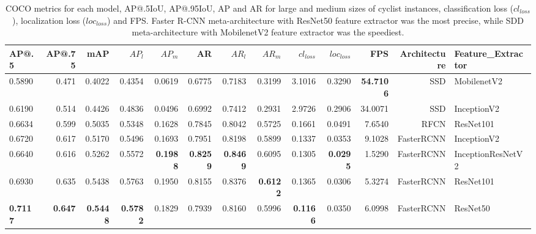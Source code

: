 \documentclass[journal]{IEEEtran}
\begin{document}
\begin{table*}[hb!]
\begin{minipage}[c]{0.95\textwidth}
\caption{COCO metrics for each model, AP@.5IoU, AP@.95IoU, AP and AR for large and medium sizes of cyclist instances, classification loss ($cl_{loss}$), localization loss ($loc_{loss}$) and FPS. Faster R-CNN meta-architecture with ResNet50 feature extractor was the most precise, while SDD meta-architecture with MobilenetV2 feature extractor was the speediest.
\label{table:Cyclist_Orientation_mAP}}
\end{minipage}
\addtolength{\tabcolsep}{-1pt}
\begin{center}
\begin{tabular}{|lrrrrrrrrrrrl|}
\toprule
AP@.5 &  AP@.75 &     mAP &   $AP_{l}$ &  $AP_{m}$  &      AR &    $AR_{l}$  &    $AR_{m}$  &  $cl_{loss}$ & $loc_{loss}$ &    FPS & Architecture &  Feature\_Extractor \\
\toprule
\midrule
0.5890 &  0.471 &  0.4022 &  0.4354 &  0.0619 &  0.6775 &  0.7183 &  0.3199 &     3.1016 &    0.3290 &  \textbf{54.7106} &          SSD &        MobilenetV2 \\
0.6190 &  0.514 &  0.4426 &  0.4836 &  0.0496 &  0.6992 &  0.7412 &  0.2931 &     2.9726 &    0.2906 &  34.0071 &          SSD &        InceptionV2 \\
0.6634 &  0.599 &  0.5035 &  0.5348 &  0.1628 &  0.7845 &  0.8042 &  0.5725 &     0.1661 &    0.0491 &   7.6540 &         RFCN &          ResNet101 \\
0.6720 &  0.617 &  0.5170 &  0.5496 &  0.1693 &  0.7951 &  0.8198 &  0.5899 &     0.1337 &    0.0353 &   9.1028 &   FasterRCNN &        InceptionV2 \\
0.6640 &  0.616 &  0.5262 &  0.5572 &  \textbf{0.1988} &  \textbf{0.8259}&  \textbf{0.8469} &  0.6095 &     0.1305 &    \textbf{0.0295} &   1.5290 &   FasterRCNN &  InceptionResNetV2 \\
0.6930 &  0.635 &  0.5438 &  0.5763 &  0.1950 &  0.8155 &  0.8376 &  \textbf{0.6122} &     0.1365 &    0.0306 &   5.3274 &   FasterRCNN &          ResNet101 \\
\textbf{0.7117} & \textbf{ 0.647} &  \textbf{0.5448} &  \textbf{0.5782} &  0.1829 &  0.7939 &  0.8160 &  0.5996 &     \textbf{0.1166} &    0.0350 &   6.0998 &   FasterRCNN &           ResNet50 \\
\bottomrule
\end{tabular}
\end{center}
\end{table*}
\end{document}
